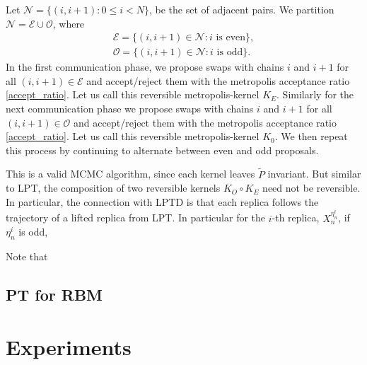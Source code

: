 \documentclass[12pt]{article}
\begin{document}
Let $\mathcal{N}=\{(i,i+1):0\leq i<N\}$, be the set of adjacent pairs. We partition $\mathcal{N}=\mathcal{E}\cup\mathcal{O}$, where
\begin{align*}
\mathcal{E}=\{(i,i+1)\in \mathcal{N}: i \text{ is even}\},\\
\mathcal{O}=\{(i,i+1)\in \mathcal{N}: i \text{ is odd}\}.
\end{align*}
In the first communication phase, we propose swaps with chains $i$ and $i+1$ for all $(i,i+1)\in\mathcal{E}$ and accept/reject them with the metropolis acceptance ratio \eqref{accept_ratio}. Let us call this reversible metropolis-kernel $K_E$. Similarly for the next communication phase we propose swaps with chains $i$ and $i+1$ for all $(i,i+1)\in\mathcal{O}$ and accept/reject them with the metropolis acceptance ratio \eqref{accept_ratio}. Let us call this reversible metropolis-kernel $K_0$. We then repeat this process by continuing to alternate between even and odd proposals. 

This is a valid MCMC algorithm, since each kernel leaves $\tilde{P}$ invariant. But similar to LPT, the composition of two reversible kernels $K_O\circ K_E$ need not be reversible. In particular, the connection with LPTD is that each replica follows the trajectory of a lifted replica from LPT. In particular for the $i$-th replica, $X_n^{\eta^i_n}$, if $\eta_n^i$ is odd, 

Note that 

\subsection{PT for RBM}
\section{Experiments}

 

\end{document}
